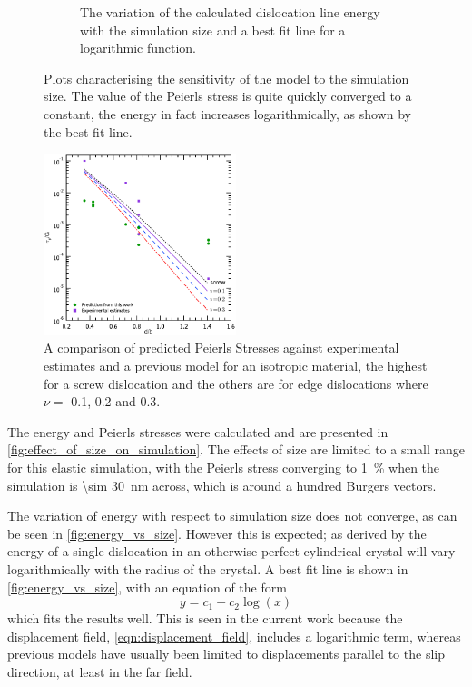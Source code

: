 \begin{figure}
\begin{subfigure}{0.4\textwidth}
\caption{The variation of the calculated dislocation line energy with the simulation size and a best fit line for a logarithmic function.\label{fig:energy_vs_size}}
\end{subfigure}
\caption[The variation of the calculated Peierls stress and dislocation line energy with simulation size.]{Plots characterising the sensitivity of the model to the simulation size. The value of the Peierls stress is quite quickly converged to a constant, the energy in fact increases logarithmically, as shown by the best fit line.\label{fig:effect_of_size_on_simulation}}
\end{figure}

\begin{figure}
\centering
\includegraphics[width=0.5\textwidth]{tp_vs_d_b}
\caption[A comparison of predicted Peierls Stresses against experimental estimates and a previous model.]{A comparison of predicted Peierls Stresses against experimental estimates \cite{Wang1996} and a previous model \cite{Clegg2006} for an isotropic material, the highest for a screw dislocation and the others are for edge dislocations where $\nu=$ 0.1, 0.2 and 0.3. \label{fig:tp_vs_d_b}}
\end{figure}


The energy and Peierls stresses were calculated and are presented in \autoref{fig:effect_of_size_on_simulation}. The effects of size are limited to a small range for this elastic simulation, with the Peierls stress converging to \SI{1}{\percent} when the simulation is  \SI{\sim 30}{\nano\meter} across, which is around a hundred Burgers vectors.

The variation of energy with respect to simulation size does not converge, as can be seen in \autoref{fig:energy_vs_size}. However this is expected; as derived by \citet{Nabarro1947} the energy of a single dislocation in an otherwise perfect cylindrical crystal will vary logarithmically with the radius of the crystal. A best fit line is shown in \autoref{fig:energy_vs_size}, with an equation of the form
\begin{equation}
y = c_1 + c_2 \log \left( x \right)
\end{equation}
which fits the results well. This is seen in the current work because the displacement field, \ref{eqn:displacement_field},  includes a logarithmic term, whereas previous models have usually been limited to displacements parallel to the slip direction, at least in the far field.



